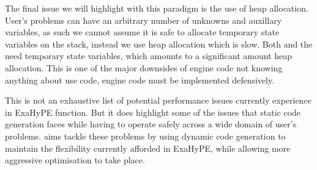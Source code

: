 The final issue we will highlight with this paradigm is the use of heap allocation.
User's problems can have an arbitrary number of unknowns and auxillary variables, 
as such we cannot assume it is safe to allocate temporary state variables on the stack, instead we use heap allocation which is slow.
Both  and the  need temporary state variables, which amounts to a significant amount heap allocation.
This is one of the major downsides of engine code not knowing anything about use code, engine code must be implemented defensively.


This is not an exhaustive list of potential performance issues currently experience in ExaHyPE  function.
But it does highlight some of the issues that static code generation faces while having to operate safely across a wide domain of user's problems.
\phlat aims tackle these problems by using dynamic code generation to maintain the flexibility currently afforded in ExaHyPE, while allowing more aggressive optimisation to take place.
